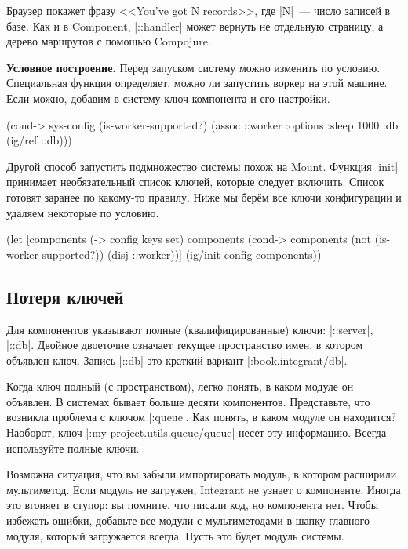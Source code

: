 Браузер покажет фразу <<You've got N records>>, где \spverb|N|~--- число записей
в базе. Как и в Component, \spverb|::handler| может вернуть не отдельную
страницу, а дерево маршрутов с помощью Compojure.

\textbf{Условное построение.} Перед запуском систему можно изменить по
условию. Специальная функция определяет, можно ли запустить воркер на этой
машине. Если можно, добавим в систему ключ компонента и его настройки.

\begin{english}
  \begin{clojure}
(cond-> sys-config
  (is-worker-supported?)
  (assoc ::worker {:options {:sleep 1000}
                   :db (ig/ref ::db)}))
  \end{clojure}
\end{english}

Другой способ запустить подмножество системы похож на Mount. Функция
\spverb|init| принимает необязательный список ключей, которые следует
включить. Список готовят заранее по какому-то правилу. Ниже мы бер\"{е}м все
ключи конфигурации и удаляем некоторые по условию.

\begin{english}
  \begin{clojure}
(let [components (-> config keys set)
      components (cond-> components
                   (not (is-worker-supported?))
                   (disj ::worker))]
  (ig/init config components))
  \end{clojure}
\end{english}

\subsection{Потеря ключей}

Для компонентов указывают полные (квалифицированные) ключи: \spverb|::server|,
\spverb|::db|. Двойное двоеточие означает текущее пространство имен, в котором
объявлен ключ. Запись \spverb|::db| это краткий вариант
\spverb|:book.integrant/db|.

Когда ключ полный (с пространством), легко понять, в каком модуле он объявлен. В
системах бывает больше десяти компонентов. Представьте, что возникла проблема с
ключом \spverb|:queue|. Как понять, в каком модуле он находится?  Наоборот, ключ
\spverb|:my-project.utils.queue/queue| несет эту информацию. Всегда используйте
полные ключи.

Возможна ситуация, что вы забыли импортировать модуль, в котором расширили
мультиметод. Если модуль не загружен, Integrant не узнает о компоненте. Иногда
это вгоняет в ступор: вы помните, что писали код, но компонента нет. Чтобы
избежать ошибки, добавьте все модули с мультиметодами в шапку главного модуля,
который загружается всегда. Пусть это будет модуль системы.

